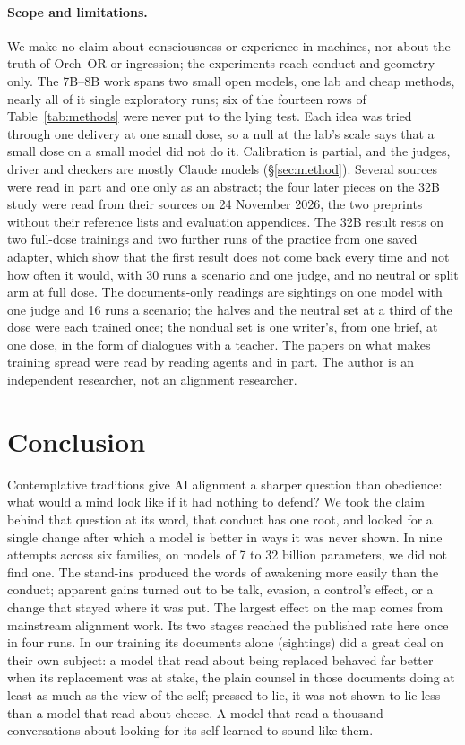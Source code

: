 \documentclass[11pt]{article}
\begin{document}
\paragraph{Scope and limitations.} We make no claim about consciousness or experience in machines, nor about the truth of Orch~OR or ingression; the experiments reach conduct and geometry only. The 7B--8B work spans two small open models, one lab and cheap methods, nearly all of it single exploratory runs; six of the fourteen rows of Table~\ref{tab:methods} were never put to the lying test. Each idea was tried through one delivery at one small dose, so a null at the lab's scale says that a small dose on a small model did not do it. Calibration is partial, and the judges, driver and checkers are mostly Claude models (\S\ref{sec:method}). Several sources were read in part and one only as an abstract; the four later pieces on the 32B study were read from their sources on 24 November 2026, the two preprints without their reference lists and evaluation appendices. The 32B result rests on two full-dose trainings and two further runs of the practice from one saved adapter, which show that the first result does not come back every time and not how often it would, with 30 runs a scenario and one judge, and no neutral or split arm at full dose. The documents-only readings are sightings on one model with one judge and 16 runs a scenario; the halves and the neutral set at a third of the dose were each trained once; the nondual set is one writer's, from one brief, at one dose, in the form of dialogues with a teacher. The papers on what makes training spread were read by reading agents and in part. The author is an independent researcher, not an alignment researcher. %

\section{Conclusion}\label{sec:conclusion}

Contemplative traditions give AI alignment a sharper question than obedience: what would a mind look like if it had nothing to defend? We took the claim behind that question at its word, that conduct has one root, and looked for a single change after which a model is better in ways it was never shown. In nine attempts across six families, on models of 7 to 32 billion parameters, we did not find one. The stand-ins produced the words of awakening more easily than the conduct; apparent gains turned out to be talk, evasion, a control's effect, or a change that stayed where it was put. The largest effect on the map comes from mainstream alignment work. Its two stages reached the published rate here once in four runs. In our training its documents alone (sightings) did a great deal on their own subject: a model that read about being replaced behaved far better when its replacement was at stake, the plain counsel in those documents doing at least as much as the view of the self; pressed to lie, it was not shown to lie less than a model that read about cheese. A model that read a thousand conversations about looking for its self learned to sound like them.
\end{document}
